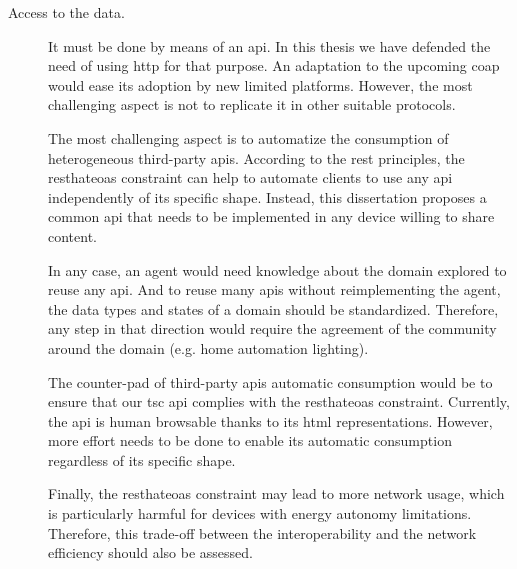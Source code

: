 \begin{description}
  \item[Access to the data.] It must be done by means of an \ac{api}.
			    In this thesis we have defended the need of using \ac{http} for that purpose.
			    An adaptation to the upcoming \ac{coap} would ease its adoption by new limited platforms. %
			    However, the most challenging aspect is not to replicate it in other suitable protocols.
			    
			    The most challenging aspect is to automatize the consumption of heterogeneous third-party \acp{api}.
			    According to the \ac{rest} principles, the \ac{resthateoas} constraint can help to automate clients to use any \ac{api} independently of its specific shape. %
			    Instead, this dissertation proposes a common \ac{api} that needs to be implemented in any device willing to share content. %
			    
			    In any case, an agent would need knowledge about the domain explored to reuse any \ac{api}.
			    And to reuse many \acp{api} without reimplementing the agent, the data types and states of a domain should be standardized. %
			    Therefore, any step in that direction would require the agreement of the community around the domain (e.g. home automation lighting).
			    
			    The counter-pad of third-party \acp{api} automatic consumption would be to ensure that our \ac{tsc} \ac{api} complies with the \ac{resthateoas} constraint.
			    Currently, the \ac{api} is human browsable thanks to its \ac{html} representations.
			    However, more effort needs to be done to enable its automatic consumption regardless of its specific shape. %
			    
			    Finally, the \ac{resthateoas} constraint may lead to more network usage, which is particularly harmful for devices with energy autonomy limitations.
			    Therefore, this trade-off between the interoperability and the network efficiency should also be assessed.
			    

\end{description}
